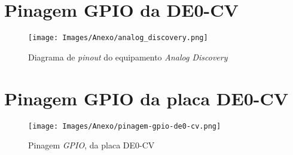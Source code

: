 \documentclass[amsmath,amssymb,floatfix]{report}
\makeatletter
\newcommand{\annexname}{Anexo}
\newcommand\annex{\par
  \setcounter{chapter}{0}%
  \setcounter{section}{0}%
  \gdef\@chapapp{\annexname}%
  \gdef\thechapter{\@Roman\c@chapter}}
\makeatother
\begin{document}
\begin{comment}
\multicolumn{1}{|c|}{19}          & \multicolumn{1}{c|}{Reinicia o circuito} & \multicolumn{1}{c|}{reset=1}                                                            & \multicolumn{1}{c|}{db\_estado=0x0}              \\ \hline
\multicolumn{1}{|c|}{20}          & \multicolumn{1}{c|}{Inicia o circuito}       & \multicolumn{1}{c|}{iniciar=1}                                                          & \multicolumn{1}{c|}{tempoMedio=0d0}                                                    \\ \hline
\end{tabular}
\caption{Teste para o caso em que o jogador acerta todas as rodadas feitas apertando um botão de cada vez.}
\label{tab:testbench41_exp}
\end{table}
\end{comment}

\annex
\chapter{Pinagem GPIO da DE0-CV}
\label{annex:analogDiscovery}

\begin{figure}[H]
\centering
\texttt{[image: Images/Anexo/analog\_discovery.png]} 
    \caption{Diagrama de \textit{pinout} do equipamento \textit{Analog Discovery}}
    \label{fig:analogdiscovery}
\end{figure}

\chapter{Pinagem GPIO da placa DE0-CV}
\label{annex:gpio}

\begin{figure}[H]
\centering
\texttt{[image: Images/Anexo/pinagem-gpio-de0-cv.png]} 
    \caption{Pinagem \textit{GPIO}, da placa DE0-CV}
    \label{fig:gpio}
\end{figure}

\end{document}
